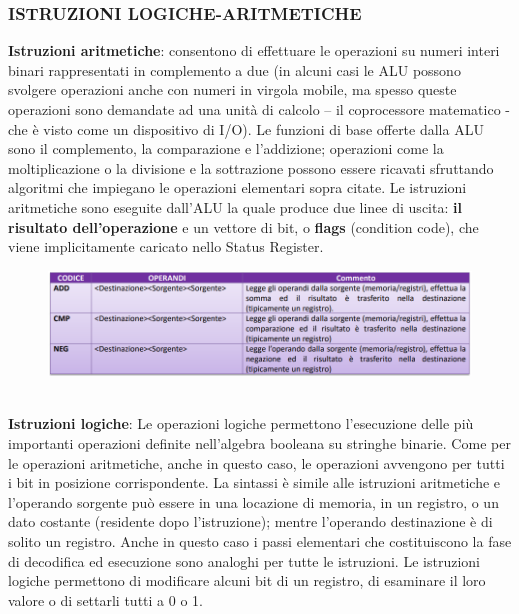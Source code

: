 \documentclass[12pt]{article} %
\begin{document}
\subsubsection{ISTRUZIONI LOGICHE-ARITMETICHE}
\textbf{Istruzioni aritmetiche}:  consentono di effettuare le operazioni su numeri interi binari rappresentati in complemento a due (in alcuni casi le ALU possono svolgere operazioni anche con numeri in virgola mobile, ma spesso queste operazioni sono demandate ad una unità di calcolo – il coprocessore matematico - che è visto come un dispositivo di I/O). Le funzioni di base offerte dalla ALU sono il complemento, la comparazione e l’addizione; operazioni come la moltiplicazione o la divisione e la sottrazione possono essere ricavati sfruttando algoritmi che impiegano le operazioni elementari sopra citate. Le istruzioni aritmetiche sono eseguite dall’ALU la quale produce due linee di uscita: \textbf{il risultato dell’operazione} e un vettore di bit, o \textbf{flags} (condition code), che viene implicitamente caricato nello Status Register.
\begin{figure}[h]
    \centering
    \includegraphics[width=1\linewidth]{operazioni logico aritmetiche.png}
\end{figure}
\par\maketitle\noindent \\ 
\textbf{Istruzioni logiche}: Le operazioni logiche permettono l’esecuzione delle più importanti operazioni definite nell’algebra booleana su stringhe binarie. Come per le operazioni aritmetiche, anche in questo caso, le operazioni avvengono per tutti i bit in posizione corrispondente. La sintassi è simile alle istruzioni aritmetiche e l’operando sorgente può essere in una locazione di memoria, in un registro, o un dato costante (residente dopo l’istruzione); mentre l’operando destinazione è di solito un registro. Anche in questo caso i passi elementari che costituiscono la fase di decodifica ed esecuzione sono analoghi per tutte le istruzioni. Le istruzioni logiche permettono di modificare alcuni bit di un registro, di esaminare il loro valore o di settarli tutti a 0 o 1.
\end{document}
